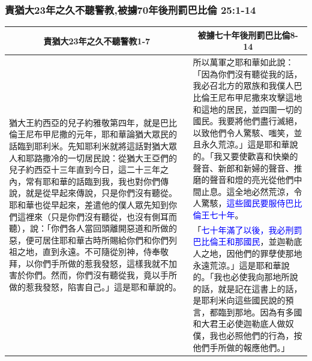 \subsubsection{責猶大23年之久不聽警教,被擄70年後刑罰巴比倫 25:1-14}
\begin{table}[H]
\centering
\begin{tabular}{p{}|p{}}\hline\hline
\multicolumn{1}{c|}{責猶大23年之久不聽警教1-7}&\multicolumn{1}{c}{被擄七十年後刑罰巴比倫8-14}\\\hline
\multirow{2}{8.25cm}{猶大王約西亞的兒子約雅敬第四年，就是巴比倫王尼布甲尼撒的元年，耶和華論猶大眾民的話臨到耶利米。先知耶利米就將這話對猶大眾人和耶路撒冷的一切居民說：從猶大王亞們的兒子約西亞十三年直到今日，這二十三年之內，常有耶和華的話臨到我，我也對你們傳說，就是從早起來傳說，只是你們沒有聽從。耶和華也從早起來，差遣他的僕人眾先知到你們這裡來（只是你們沒有聽從，也沒有側耳而聽），說：「你們各人當回頭離開惡道和所做的惡，便可居住耶和華古時所賜給你們和你們列祖之地，直到永遠。不可隨從別神，侍奉敬拜，以你們手所做的惹我發怒，這樣我就不加害於你們。然而，你們沒有聽從我，竟以手所做的惹我發怒，陷害自己。」這是耶和華說的。}
&所以萬軍之耶和華如此說：「因為你們沒有聽從我的話，我必召北方的眾族和我僕人巴比倫王尼布甲尼撒來攻擊這地和這地的居民，並四圍一切的國民。我要將他們盡行滅絕，以致他們令人驚駭、嗤笑，並且永久荒涼。」這是耶和華說的。「我又要使歡喜和快樂的聲音、新郎和新婦的聲音、推磨的聲音和燈的亮光從他們中間止息。這全地必然荒涼，令人驚駭，\textcolor{blue}{這些國民要服侍巴比倫王七十年}。
\\\cline{2-2}
&「\textcolor{blue}{七十年滿了以後，我必刑罰巴比倫王和那國民}，並迦勒底人之地，因他們的罪孽使那地永遠荒涼。」這是耶和華說的。「我也必使我向那地所說的話，就是記在這書上的話，是耶利米向這些國民說的預言，都臨到那地。因為有多國和大君王必使迦勒底人做奴僕，我也必照他們的行為，按他們手所做的報應他們。」\\\hline
\end{tabular}
\end{table}






